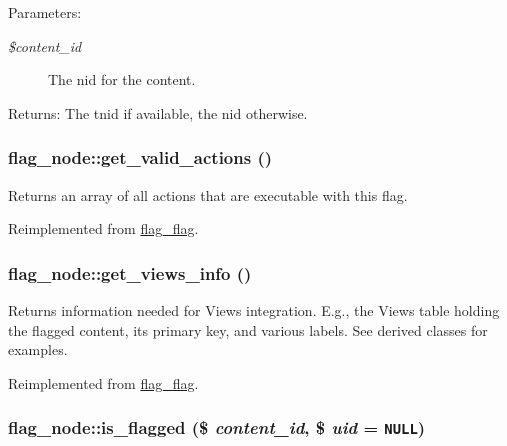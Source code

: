 \begin{Desc}
\item[Parameters:]
\begin{description}
\item[{\em \$content\_\-id}]The nid for the content. \end{description}
\end{Desc}
\begin{Desc}
\item[Returns:]The tnid if available, the nid otherwise. \end{Desc}
\hypertarget{classflag__node_6bb9b8d25c34816cd3e7b5c11038374a}{
\subsubsection[{get\_\-valid\_\-actions}]{\setlength{\rightskip}{0pt plus 5cm}flag\_\-node::get\_\-valid\_\-actions ()}}
\label{classflag__node_6bb9b8d25c34816cd3e7b5c11038374a}


Returns an array of all actions that are executable with this flag. 

Reimplemented from \hyperlink{group__actions_gbe1aa2bfc551fab8660cc3bacfc9d509}{flag\_\-flag}.\hypertarget{classflag__node_bea5310889ebc0a8564823f3067d5846}{
\subsubsection[{get\_\-views\_\-info}]{\setlength{\rightskip}{0pt plus 5cm}flag\_\-node::get\_\-views\_\-info ()}}
\label{classflag__node_bea5310889ebc0a8564823f3067d5846}


Returns information needed for Views integration. E.g., the Views table holding the flagged content, its primary key, and various labels. See derived classes for examples. 

Reimplemented from \hyperlink{group__views_g91f53a4d24f7c81f8a913e56154821c0}{flag\_\-flag}.\hypertarget{classflag__node_4e9609c89fcd8ec905c6537d241fd49f}{
\subsubsection[{is\_\-flagged}]{\setlength{\rightskip}{0pt plus 5cm}flag\_\-node::is\_\-flagged (\$ {\em content\_\-id}, \/  \$ {\em uid} = {\tt NULL})}}
\label{classflag__node_4e9609c89fcd8ec905c6537d241fd49f}


